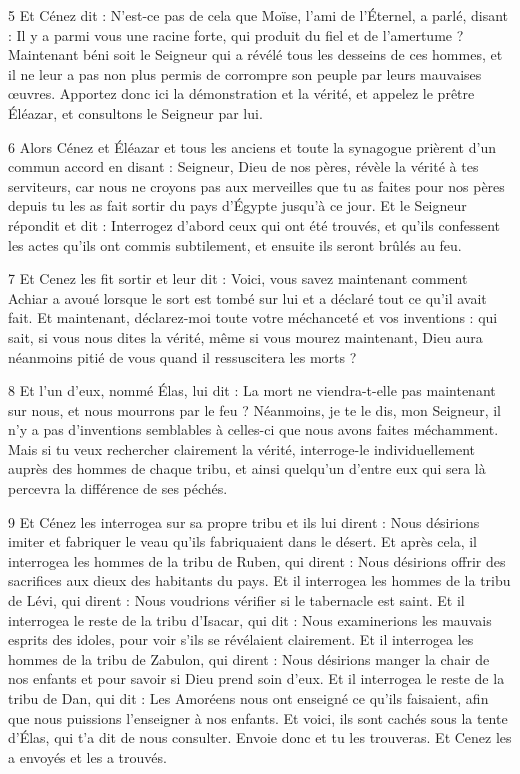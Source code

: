 \par 5 Et Cénez dit : N'est-ce pas de cela que Moïse, l'ami de l'Éternel, a parlé, disant : Il y a parmi vous une racine forte, qui produit du fiel et de l'amertume ? Maintenant béni soit le Seigneur qui a révélé tous les desseins de ces hommes, et il ne leur a pas non plus permis de corrompre son peuple par leurs mauvaises œuvres. Apportez donc ici la démonstration et la vérité, et appelez le prêtre Éléazar, et consultons le Seigneur par lui.

\par 6 Alors Cénez et Éléazar et tous les anciens et toute la synagogue prièrent d'un commun accord en disant : Seigneur, Dieu de nos pères, révèle la vérité à tes serviteurs, car nous ne croyons pas aux merveilles que tu as faites pour nos pères depuis tu les as fait sortir du pays d'Égypte jusqu'à ce jour. Et le Seigneur répondit et dit : Interrogez d'abord ceux qui ont été trouvés, et qu'ils confessent les actes qu'ils ont commis subtilement, et ensuite ils seront brûlés au feu.

\par 7 Et Cenez les fit sortir et leur dit : Voici, vous savez maintenant comment Achiar a avoué lorsque le sort est tombé sur lui et a déclaré tout ce qu'il avait fait. Et maintenant, déclarez-moi toute votre méchanceté et vos inventions : qui sait, si vous nous dites la vérité, même si vous mourez maintenant, Dieu aura néanmoins pitié de vous quand il ressuscitera les morts ?

\par 8 Et l'un d'eux, nommé Élas, lui dit : La mort ne viendra-t-elle pas maintenant sur nous, et nous mourrons par le feu ? Néanmoins, je te le dis, mon Seigneur, il n'y a pas d'inventions semblables à celles-ci que nous avons faites méchamment. Mais si tu veux rechercher clairement la vérité, interroge-le individuellement auprès des hommes de chaque tribu, et ainsi quelqu'un d'entre eux qui sera là percevra la différence de ses péchés.

\par 9 Et Cénez les interrogea sur sa propre tribu et ils lui dirent : Nous désirions imiter et fabriquer le veau qu'ils fabriquaient dans le désert. Et après cela, il interrogea les hommes de la tribu de Ruben, qui dirent : Nous désirions offrir des sacrifices aux dieux des habitants du pays. Et il interrogea les hommes de la tribu de Lévi, qui dirent : Nous voudrions vérifier si le tabernacle est saint. Et il interrogea le reste de la tribu d'Isacar, qui dit : Nous examinerions les mauvais esprits des idoles, pour voir s'ils se révélaient clairement. Et il interrogea les hommes de la tribu de Zabulon, qui dirent : Nous désirions manger la chair de nos enfants et pour savoir si Dieu prend soin d'eux. Et il interrogea le reste de la tribu de Dan, qui dit : Les Amoréens nous ont enseigné ce qu'ils faisaient, afin que nous puissions l'enseigner à nos enfants. Et voici, ils sont cachés sous la tente d'Élas, qui t'a dit de nous consulter. Envoie donc et tu les trouveras. Et Cenez les a envoyés et les a trouvés.

